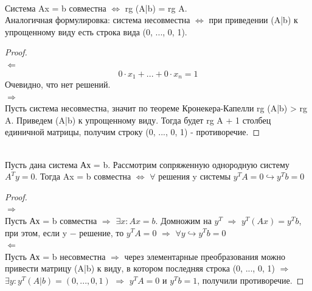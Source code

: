 \begin{theorem}
\tab\\
    Система Ax = b совместна $\Longleftrightarrow$ rg (A|b) = rg A.\\

    Аналогичная формулировка: система несовместна $\Longleftrightarrow$ при приведении (A|b) к упрощенному виду есть строка вида (0, ..., 0, 1).
\end{theorem}
\begin{proof}
    \tab\\

    $\Longleftarrow$\\

    \[
    0\cdot x_1 + ... + 0\cdot x_n = 1
    \]
    Очевидно, что нет решений.\\

    $\Longrightarrow$\\

    Пусть система несовместна, значит по теореме Кронекера-Капелли rg (A|b) > rg A. Приведем (A|b) к упрощенному виду. Тогда будет rg A + 1 столбец единичной матрицы, получим строку (0, ..., 0, 1) - противоречие.
\end{proof}

\begin{theorem}
\tab\\
Пусть дана система Ах = b. Рассмотрим сопряженную однородную систему $A^Ty = 0$. Тогда Ax = b совместна $\Longleftrightarrow$ $\forall$ решения y системы $y^TA = 0 \hookrightarrow y^Tb = 0$
    
\end{theorem}
\begin{proof}
    \tab\\

    $\Longrightarrow$\\

    Пусть Ах = b совместна $\Longrightarrow$ $\exists x : Ax = b$. Домножим на $y^T$ $\Longrightarrow$ $y^T(Ax) = y^Tb$, при этом, если y $-$ решение, то $y^TA = 0$ $\Longrightarrow$ $\forall y \hookrightarrow y^Tb = 0$\\

    $\Longleftarrow$\\

    Пусть Ах = b несовместна $\Longrightarrow$ через элементарные преобразования можно привести матрицу (A|b) к виду, в котором последняя строка (0, ..., 0, 1) $\Longrightarrow$ $\exists y : y^T(A|b) = (0, ..., 0, 1)$ $\Longrightarrow$ $y^TA = 0$ и $y^Tb = 1$, получили противоречие.
\end{proof}

